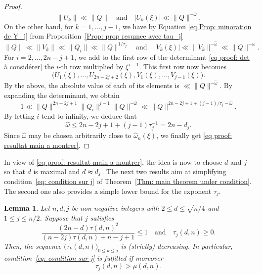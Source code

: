 \documentclass[JEP,XML,SOM,Unicode,NoFloatCountersInSection,published]{cedram}
\newcommand\homega{\widehat{\omega}}\newcommand\HH{\mathcal{H}}
\newcommand{\normH}[1]{\|#1\|}
\newcommand\AND{\quad\text{and}\quad}
\theoremstyle{definition}
\theoremstyle{plain}
\newtheorem{Lem}[Def]{Lemma}
\begin{document}
\begin{proof}
\begin{equation*}
\normH{U_k} \ll \normH{Q} \AND |U_k(\xi)| \ll \normH{Q}^{-\homega}.
\end{equation*}
On the other hand, for $k=1,\dots,j-1$, we have by Equation \eqref{eq Prop: minoration de Y_j} from Proposition~\ref{Prop: prop resumee avec tau_j}
\begin{equation*}
\normH{Q} \ll \normH{V_k} \ll \normH{Q_i} \ll \normH{Q}^{1/\tau_j} \AND |V_k(\xi)| \ll \normH{V_k}^{-\homega} \ll \normH{Q}^{-\homega}.
\end{equation*}
For $i=2,\dots,2n-j+1$, we add to the first row of the determinant \eqref{eq proof: det à considérer} the $i$-th row multiplied by $\xi^{i-1}$. This first row now becomes
\[
\big(U_1(\xi),\dots,U_{2n-2j+2}(\xi),V_1(\xi),\dots,V_{j-1}(\xi)).
\]
By the above, the absolute value of each of its elements is $\ll \normH{Q}^{-\homega}$. By expanding the determinant, we obtain
\begin{equation*}
1 \ll \normH{Q}^{2n-2j+1}\normH{Q_i}^{j-1}\normH{Q}^{-\homega} \ll \normH{Q}^{2n-2j+1+(j-1)/\tau_j-\homega}.
\end{equation*}
By letting $i$ tend to infinity, we deduce that
\begin{equation*}
\homega \leq 2n-2j+1+(j-1)\tau_j^{-1} = 2n-d_j.
\end{equation*}
Since $\homega$ may be chosen arbitrarily close to $\homega_n(\xi)$, we finally get \eqref{eq proof: resultat main a montrer}.
\end{proof}

In view of \eqref{eq proof: resultat main a montrer}, the idea is now to choose $d$ and $j$ so that $d$ is maximal and $d \thickapprox d_j$. The next two results aim at simplifying condition~\eqref{eq: condition sur j} of Theorem~\ref{Thm: main theorem under condition}. The second one also provides a simple lower bound for the exponent $\tau_j$.

\begin{Lem}
\label{lem: condition thm clef seulement pour k=j}
Let $n,d, j$ be non-negative integers with $2\leq d \leq \sqrt{n/4}$ and $ 1\leq j\leq n/2$. Suppose that $j$ satisfies
\begin{equation}
\label{eq lem: condition sur k=j seulement pour tau_j}
\frac{(2n-d)\tau(d,n)^2}{(n-2j)\tau(d,n)+n-j+1} \leq 1 \AND \tau_j(d,n) \geq 0.
\end{equation}
Then, the sequence $\big(\tau_k(d,n)\big)_{0\leq k \leq j}$ is (strictly) decreasing. In particular, condition~\eqref{eq: condition sur j} is fulfilled if moreover
\begin{equation*}
\tau_j(d,n) > \mu(d,n).
\end{equation*}
\end{Lem}
\end{document}

